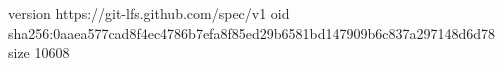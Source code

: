 version https://git-lfs.github.com/spec/v1
oid sha256:0aaea577cad8f4ec4786b7efa8f85ed29b6581bd147909b6c837a297148d6d78
size 10608
